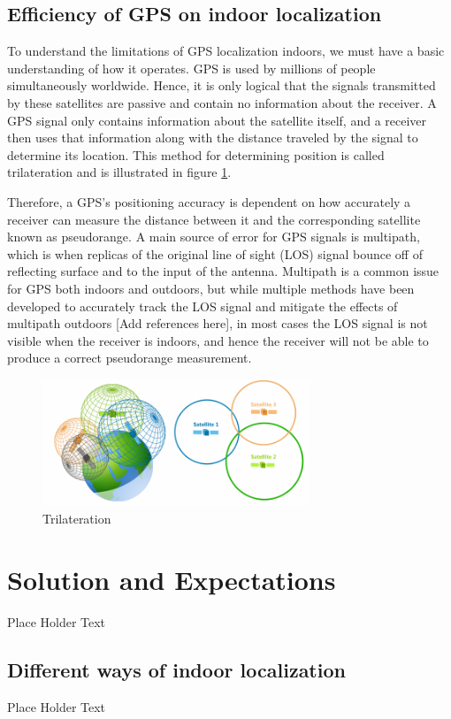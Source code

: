 \documentclass{article}
\begin{document}
\subsection{Efficiency of GPS on indoor localization}
To understand the limitations of GPS localization indoors, we must have a basic understanding of how it operates. GPS is used by millions of people simultaneously worldwide. Hence, it is only logical that the signals transmitted by these satellites are passive and contain no information about the receiver. A GPS signal only contains information about the satellite itself, and a receiver then uses that information along with the distance traveled by the signal to determine its location. This method for determining position is called trilateration and is illustrated in figure \ref{trilateration}.
\newline

Therefore, a GPS's positioning accuracy is dependent on how accurately a receiver can measure the distance between it and the corresponding satellite known as pseudorange. A main source of error for GPS signals is multipath, which is when replicas of the original line of sight (LOS) signal bounce off of reflecting surface and to the input of the antenna. Multipath is a common issue for GPS both indoors and outdoors, but while multiple methods have been developed to accurately track the LOS signal and mitigate the effects of multipath outdoors [Add references here], in most cases the LOS signal is not visible when the receiver is indoors, and hence the receiver will not be able to produce a correct pseudorange measurement.


\begin{figure}[h!]
\centering
\includegraphics[width=8cm]{Trilateration}
\caption{\label{trilateration} Trilateration }
\end{figure}


\section{Solution and Expectations}
Place Holder Text

\subsection{Different ways of indoor localization}
Place Holder Text
\end{document}
